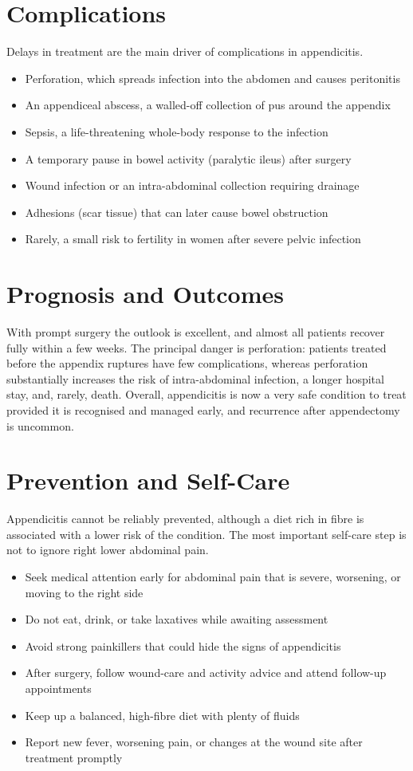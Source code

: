 \section*{Complications}
Delays in treatment are the main driver of complications in appendicitis.

\begin{itemize}
    \item Perforation, which spreads infection into the abdomen and causes peritonitis
    \item An appendiceal abscess, a walled-off collection of pus around the appendix
    \item Sepsis, a life-threatening whole-body response to the infection
    \item A temporary pause in bowel activity (paralytic ileus) after surgery
    \item Wound infection or an intra-abdominal collection requiring drainage
    \item Adhesions (scar tissue) that can later cause bowel obstruction
    \item Rarely, a small risk to fertility in women after severe pelvic infection
\end{itemize}

\section*{Prognosis and Outcomes}
With prompt surgery the outlook is excellent, and almost all patients recover fully within a few weeks. The principal danger is perforation: patients treated before the appendix ruptures have few complications, whereas perforation substantially increases the risk of intra-abdominal infection, a longer hospital stay, and, rarely, death. Overall, appendicitis is now a very safe condition to treat provided it is recognised and managed early, and recurrence after appendectomy is uncommon.

\section*{Prevention and Self-Care}
Appendicitis cannot be reliably prevented, although a diet rich in fibre is associated with a lower risk of the condition. The most important self-care step is not to ignore right lower abdominal pain.

\begin{itemize}
    \item Seek medical attention early for abdominal pain that is severe, worsening, or moving to the right side
    \item Do not eat, drink, or take laxatives while awaiting assessment
    \item Avoid strong painkillers that could hide the signs of appendicitis
    \item After surgery, follow wound-care and activity advice and attend follow-up appointments
    \item Keep up a balanced, high-fibre diet with plenty of fluids
    \item Report new fever, worsening pain, or changes at the wound site after treatment promptly
\end{itemize}

